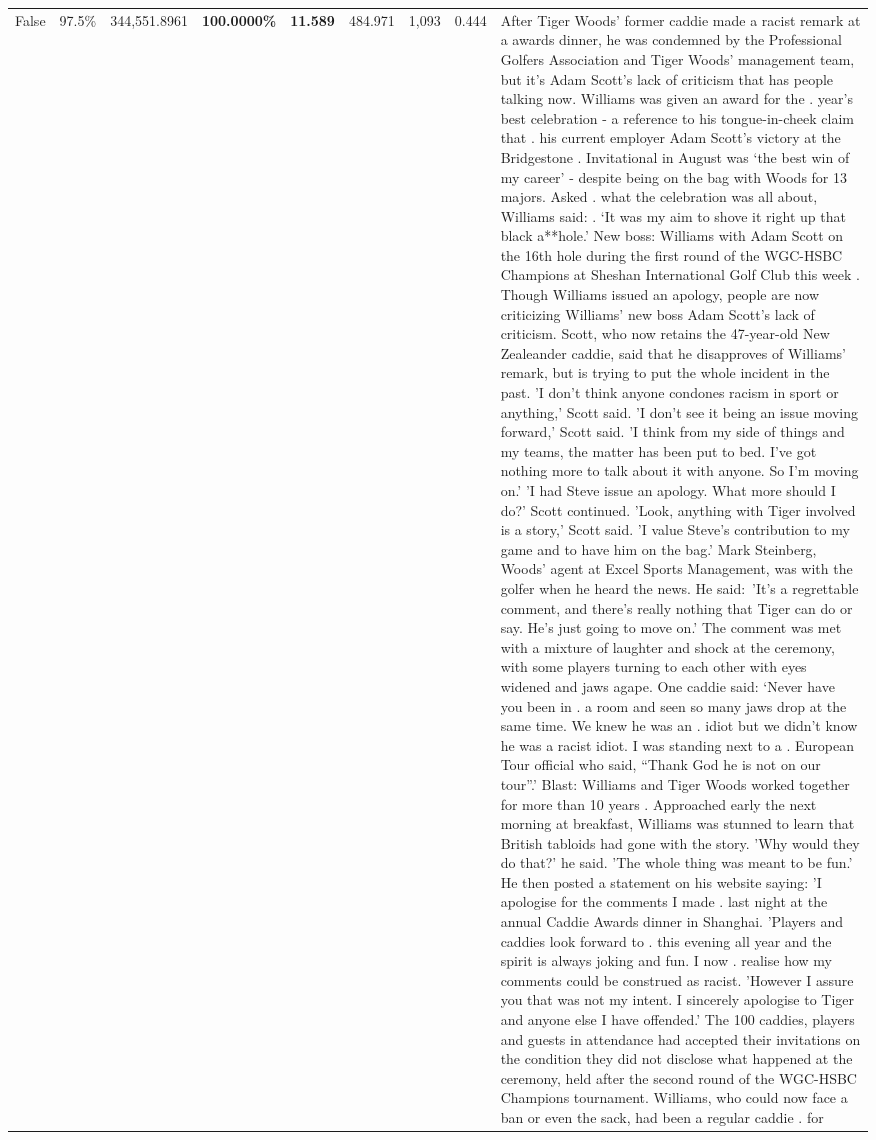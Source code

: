 \begin{table}[H]
\begin{tabular}{lllrlllll}
False & 97.5\% & 344,551.8961 & \bfseries \color{red} 100.0000\% & \bfseries \color{red} 11.589 & 484.971 & 1,093 & 0.444 & After Tiger Woods' former caddie made a racist remark at a awards dinner, he was condemned by the Professional Golfers Association and Tiger Woods' management team, but it's Adam Scott's lack of criticism that has people talking now. Williams was given an award for the . year’s best celebration - a reference to his tongue-in-cheek claim that . his current employer Adam Scott’s victory at the Bridgestone . Invitational in August was ‘the best win of my career’ - despite being on the bag with Woods for 13 majors. Asked . what the celebration was all about, Williams said: . ‘It was my aim to shove it right up that black a**hole.’ New boss: Williams with Adam Scott  on the 16th hole during the first round of the WGC-HSBC Champions at Sheshan International Golf Club this week . Though Williams issued an apology, people are now criticizing Williams' new boss Adam Scott's lack of criticism. Scott, who now retains the 47-year-old New Zealeander caddie, said that he disapproves of Williams' remark, but is trying to put the whole incident in the past. 'I don't think anyone condones racism in sport or anything,' Scott said. 'I don't see it being an issue moving forward,' Scott said. 'I think from my side of things and my teams, the matter has been put to bed. I've got nothing more to talk about it with anyone. So I'm moving on.' 'I had Steve issue an apology. What more should I do?' Scott continued. 'Look, anything with Tiger involved is a story,' Scott said. 'I value Steve's contribution to my game and to have him on the bag.' Mark Steinberg, Woods' agent at Excel Sports Management, was with the golfer when he heard the news. He said: 'It's a regrettable comment, and there's really nothing that Tiger can do or say. He's just going to move on.' The comment was met with a mixture of laughter and shock at the ceremony, with some players turning to each other with eyes widened and jaws agape. One caddie said: ‘Never have you been in . a room and seen so many jaws drop at the same time. We knew he was an . idiot but we didn’t know he was a racist idiot. I was standing next to a . European Tour official who said, “Thank God he is not on our tour”.’ Blast: Williams and Tiger Woods worked together for more than 10 years . Approached early the next morning at breakfast, Williams was stunned to learn that British tabloids had gone with the story. 'Why would they do that?' he said. 'The whole thing was meant to be fun.' He then posted a statement on his website saying: 'I apologise for the comments I made . last night at the annual Caddie Awards dinner in Shanghai. 'Players and caddies look forward to . this evening all year and the spirit is always joking and fun. I now . realise how my comments could be construed as racist. 'However I assure you that was not my intent. I sincerely apologise to Tiger and anyone else I have offended.' The 100 caddies, players and guests in attendance had accepted their invitations on the condition they did not disclose what happened at the ceremony, held after the second round of the WGC-HSBC Champions tournament. Williams, who could now face a ban or even the sack, had been a regular caddie . for 
\end{tabular}
\end{table}
